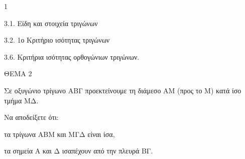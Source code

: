 \begin{ylh}{1}
    \item 3.1. Είδη και στοιχεία τριγώνων
    \item 3.2. 1ο Κριτήριο ισότητας τριγώνων
    \item 3.6. Κριτήρια ισότητας ορθογώνιων τριγώνων.
\end{ylh}

ΘΕΜΑ 2

Σε οξυγώνιο τρίγωνο ΑΒΓ προεκτείνουμε τη διάμεσο ΑΜ (προς το Μ) κατά ίσο τμήμα ΜΔ.

Να αποδείξετε ότι:

\begin{alist}
\item τα τρίγωνα ΑΒΜ και ΜΓΔ είναι ίσα, 

\item τα σημεία Α και Δ ισαπέχουν από την πλευρά ΒΓ. 
\end{alist}
